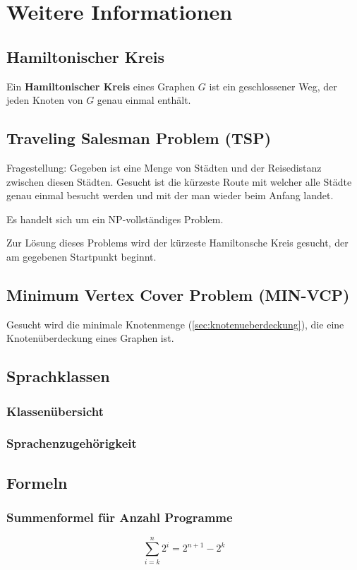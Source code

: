 \chapter{Weitere Informationen}
\section{Hamiltonischer Kreis}
Ein \textbf{Hamiltonischer Kreis} eines Graphen $G$ ist ein geschlossener Weg, der jeden Knoten von $G$ genau einmal enthält.

\section{Traveling Salesman Problem (TSP)}
Fragestellung: Gegeben ist eine Menge von Städten und der Reisedistanz zwischen diesen Städten. Gesucht ist die kürzeste Route mit welcher alle Städte genau einmal besucht werden und mit der man wieder beim Anfang landet.

Es handelt sich um ein NP-vollständiges Problem.

Zur Lösung dieses Problems wird der kürzeste Hamiltonsche Kreis gesucht, der am gegebenen Startpunkt beginnt.

\section{Minimum Vertex Cover Problem (MIN-VCP)}
Gesucht wird die minimale Knotenmenge (\ref{sec:knotenueberdeckung}), die eine Knotenüberdeckung eines Graphen ist.

\section{Sprachklassen}
\subsection{Klassenübersicht}

\subsection{Sprachenzugehörigkeit}

\section{Formeln}
\subsection{Summenformel für Anzahl Programme}
\[
\sum_{i = k}^n 2^i = 2^{n+1} - 2^k
\]
